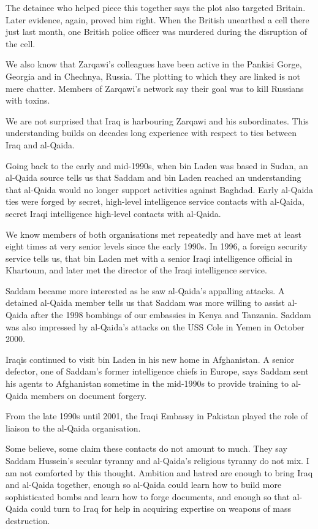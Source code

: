 \documentclass[10pt,a4paper]{article}
\begin{document}
The detainee who helped piece this together says the plot also targeted Britain. Later evidence, again, proved him right. When the British unearthed a cell there just last month, one British police officer was murdered during the disruption of the cell.

We also know that Zarqawi's colleagues have been active in the Pankisi Gorge, Georgia and in Chechnya, Russia. The plotting to which they are linked is not mere chatter. Members of Zarqawi's network say their goal was to kill Russians with toxins.

We are not surprised that Iraq is harbouring Zarqawi and his subordinates. This understanding builds on decades long experience with respect to ties between Iraq and al-Qaida.

Going back to the early and mid-1990s, when bin Laden was based in Sudan, an al-Qaida source tells us that Saddam and bin Laden reached an understanding that al-Qaida would no longer support activities against Baghdad. Early al-Qaida ties were forged by secret, high-level intelligence service contacts with al-Qaida, secret Iraqi intelligence high-level contacts with al-Qaida.

We know members of both organisations met repeatedly and have met at least eight times at very senior levels since the early 1990s. In 1996, a foreign security service tells us, that bin Laden met with a senior Iraqi intelligence official in Khartoum, and later met the director of the Iraqi intelligence service.

Saddam became more interested as he saw al-Qaida's appalling attacks. A detained al-Qaida member tells us that Saddam was more willing to assist al-Qaida after the 1998 bombings of our embassies in Kenya and Tanzania. Saddam was also impressed by al-Qaida's attacks on the USS Cole in Yemen in October 2000.

Iraqis continued to visit bin Laden in his new home in Afghanistan. A senior defector, one of Saddam's former intelligence chiefs in Europe, says Saddam sent his agents to Afghanistan sometime in the mid-1990s to provide training to al-Qaida members on document forgery.

From the late 1990s until 2001, the Iraqi Embassy in Pakistan played the role of liaison to the al-Qaida organisation.

Some believe, some claim these contacts do not amount to much. They say Saddam Hussein's secular tyranny and al-Qaida's religious tyranny do not mix. I am not comforted by this thought. Ambition and hatred are enough to bring Iraq and al-Qaida together, enough so al-Qaida could learn how to build more sophisticated bombs and learn how to forge documents, and enough so that al-Qaida could turn to Iraq for help in acquiring expertise on weapons of mass destruction.
\end{document}
